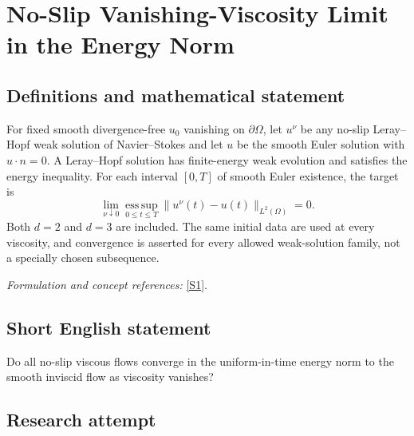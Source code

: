 \documentclass[11pt,a4paper]{article}
\newcommand{\sref}[2]{\hyperlink{source:#1:#2}{[S#2]}}
\newif\ifshowcatalogue
\newcommand{\cataloguescope}[1]{\ifshowcatalogue
 \paragraph{Exact scope in the supplied catalogue.}
 \begin{quote}\small #1\end{quote}\fi}
\numberwithin{equation}{section}
\begin{document}
\setcounter{section}{0}
\clearpage
\section*{\texorpdfstring{No-Slip Vanishing-Viscosity Limit in the Energy Norm}{No-Slip Vanishing-Viscosity Limit in the Energy Norm}}\label{statement}
\subsection{Definitions and mathematical statement}
For fixed smooth divergence-free $u_0$ vanishing on $\partial\Omega$, let $u^\nu$ be any no-slip Leray--Hopf weak solution of Navier--Stokes and let $u$ be the smooth Euler solution with $u\cdot n=0$. A Leray--Hopf solution has finite-energy weak evolution and satisfies the energy inequality. For each interval $[0,T]$ of smooth Euler existence, the target is
\[
 \lim_{\nu\downarrow0}\operatorname*{ess\,sup}_{0\le t\le T}
 \|u^\nu(t)-u(t)\|_{L^2(\Omega)}=0.
\]
Both $d=2$ and $d=3$ are included. The same initial data are used at every viscosity, and convergence is asserted for every allowed weak-solution family, not a specially chosen subsequence.
\par\smallskip\textit{Formulation and concept references:} \sref{statement}{1}.
\cataloguescope{For d in \{2,3\}, every smooth bounded domain Omega in R\textasciicircum{}d and every fixed smooth divergence-free initial velocity u0 vanishing on the boundary, prove or disprove that every no-slip Leray–Hopf Navier–Stokes family u\textasciicircum{}nu with viscosity nu and initial value u0 converges to the Euler solution u in L\textasciicircum{}infinity([0,T];L\textasciicircum{}2(Omega)) as nu tends to zero, for each T on which u is smooth and satisfies u.n=0.}
\subsection{Short English statement}
Do all no-slip viscous flows converge in the uniform-in-time energy norm to the smooth inviscid flow as viscosity vanishes?
\subsection{Research attempt}
\end{document}
